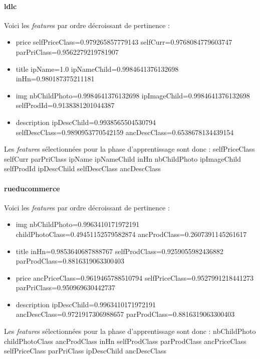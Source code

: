 \documentclass{article}
\begin{document}
\paragraph{ldlc}
Voici les \emph{feature}s par ordre décroissant de pertinence :
\begin{itemize}
    \item{price} selfPriceClass=0.979265857779143 selfCurr=0.9768084779603747 parPriClass=0.9562279219781907
    \item{title} ipName=1.0 ipNameChild=0.9984641376132698 inHn=0.980187375211181
    \item{img} nbChildPhoto=0.9984641376132698 ipImageChild=0.9984641376132698 selfProdId=0.9138381201044387
    \item{description} ipDescChild=0.9938565504530794 selfDescClass=0.9890953770542159 ancDescClass=0.6538678134439154
\end{itemize}

Les \emph{feature}s sélectionnées pour la phase d'apprentissage sont donc :
selfPriceClass selfCurr parPriClass ipName ipNameChild inHn nbChildPhoto ipImageChild selfProdId ipDescChild selfDescClass ancDescClass

\paragraph{rueducommerce}
Voici les \emph{feature}s par ordre décroissant de pertinence :
\begin{itemize}
    \item{img} nbChildPhoto=0.9963410171972191 childPhotoClass=0.49451152579582874 ancProdClass=0.2607391145261617
    \item{title} inHn=0.9853640687888767 selfProdClass=0.9259055982436882 parProdClass=0.8816319063300403
    \item{price} ancPriceClass=0.9619465788510794 selfPriceClass=0.9527991218441273 parPriClass=0.950969630442737
    \item{description} ipDescChild=0.9963410171972191 ancDescClass=0.9721917306988657 parProdClass=0.8816319063300403
\end{itemize}

Les \emph{feature}s sélectionnées pour la phase d'apprentissage sont donc :
nbChildPhoto childPhotoClass ancProdClass inHn selfProdClass parProdClass ancPriceClass selfPriceClass parPriClass ipDescChild ancDescClass
\end{document}
